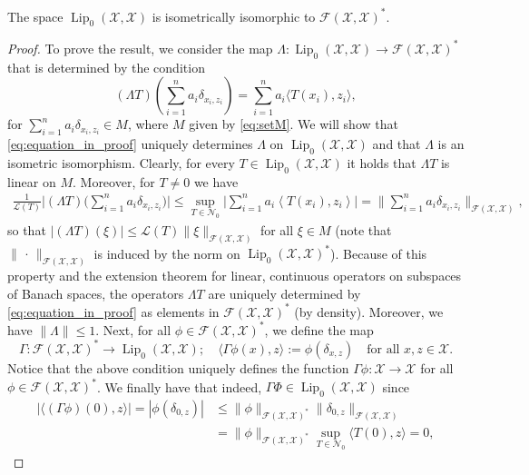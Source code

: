 \documentclass[onefignum,onetabnum]{siamonline250211}
\newcommand{\Lip}{\operatorname{Lip}}
\newcommand{\cX}{\mathcal{X}}
\begin{document}
\begin{theorem}\label{thm:predual}
   The space $\Lip_0(\cX,\cX)$ is isometrically isomorphic to $\mathcal{F}(\cX,\cX)^*$.
\end{theorem}
\begin{proof}
To prove the result, we consider the map $\Lambda \colon \Lip_0(\cX,\cX) \to \mathcal{F}(\cX,\cX)^*$ that is determined by the condition
    \begin{equation}\label{eq:equation_in_proof}
    (\Lambda T) \left(\sum_{i=1}^{n} a_i \delta_{x_i,z_i}\right) = \sum_{i=1}^n a_i \langle T(x_i), z_i \rangle,
    \end{equation}
    for $\sum_{i=1}^{n} a_i \delta_{x_i,z_i} \in M$, where $M$ given by \cref{eq:setM}. We will show that  \eqref{eq:equation_in_proof} uniquely determines $\Lambda$ on $\Lip_0(\cX, \cX)$ and that $\Lambda$ is an isometric isomorphism. Clearly, for every $T \in \Lip_0(\cX,\cX)$ it holds that $\Lambda T$ is linear on $M$. Moreover, for $T\neq 0$ we have 
\begin{equation*}
    \begin{aligned}
    \frac{1}{\mathcal{L}(T)}\bigg|(\Lambda T)\bigg(\sum_{i=1}^n a_i \delta_{x_i,z_i}\bigg)\bigg|\leq  \sup_{T \in \mathcal{N}_0} \bigg| \sum_{i=1}^n a_i\left\langle T(x_i), z_i\right\rangle\bigg| = \bigg\|\sum_{i=1}^n a_i \delta_{x_i, z_i} \bigg\|_{\mathcal{F}(\cX,\cX)},
    \end{aligned}
\end{equation*}
so that $|(\Lambda T)(\xi)| \leq \mathcal{L}(T) \|\xi\|_{\mathcal{F}(\cX,\cX)}$ for all $\xi\in M$ (note that $\|\,\cdot\,\|_{\mathcal{F}(\cX,\cX)}$ is induced by the norm on $\Lip_0(\cX, \cX)^*$). Because of this property and the extension theorem for linear, continuous operators on subspaces of Banach spaces, the operators $\Lambda T$ are uniquely determined by \eqref{eq:equation_in_proof} as elements in $\mathcal{F}(\cX,\cX)^*$ (by density). Moreover, we have $\|\Lambda\| \leq 1$. Next, for all $\phi \in \mathcal{F}(\cX,\cX)^*$, we define the map
$$
\Gamma \colon \mathcal{F}(\cX,\cX)^*\to \Lip_0(\cX,\cX); \quad \langle\Gamma \phi (x), z \rangle := \phi(\delta_{x,z}) \quad \text{for all } x, z \in \cX.
$$ 
Notice that the above condition uniquely defines the function $\Gamma \phi: \cX\to \cX$ for all $\phi \in \mathcal{F}(\cX,\cX)^*$. We finally have that indeed, $\Gamma\Phi \in \Lip_0(\cX, \cX)$ since
\begin{equation*}
    \begin{aligned}
        |\langle (\Gamma \phi)(0), z\rangle| = |\phi (\delta_{0,z})| & \leq \|\phi\|_{\mathcal{F}(\cX,\cX)^*}\| \delta_{0,z}\|_{\mathcal{F}(\cX,\cX)} \\ & = \|\phi\|_{\mathcal{F}(\cX,\cX)^*}\sup_{T\in \mathcal{N}_0}\langle T(0),z\rangle = 0,

\end{aligned}
\end{equation*}
\end{proof}
\end{document}
